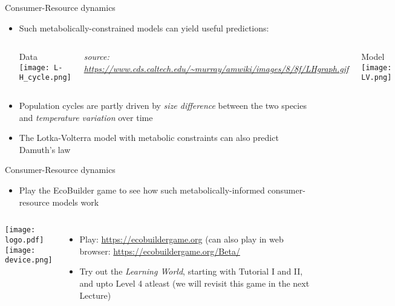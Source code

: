\begin{frame}{Consumer-Resource dynamics}

  \begin{itemize}[<+->] \itemsep3pt
    \item Such metabolically-constrained models can yield useful predictions:
    \vspace{4pt}
    \begin{columns}[c]
      \centering
        Data\\
        \texttt{[image: L-H\_cycle.png]}\\
        {\it \tiny source: \url{https://www.cds.caltech.edu/~murray/amwiki/images/8/8f/LHgraph.gif}\par}
      \centering
        Model\\
        \vspace{10pt}
        \texttt{[image: LV.png]}
    \end{columns} 
  
    \item Population cycles are partly driven by {\it size difference} between the two species and {\it temperature variation} over time

  \item The Lotka-Volterra model with metabolic constraints can also predict Damuth's law\footnotemark
  
\end{itemize}
\end{frame}

\begin{frame}{Consumer-Resource dynamics}

  \begin{itemize}[<+->] \itemsep6pt
     \item Play the EcoBuilder game to see how such metabolically-informed consumer-resource models work 
  \end{itemize}

  \begin{columns}[c]
    \centering
      \texttt{[image: logo.pdf]}\\
      \texttt{[image: device.png]}
    \centering
      \begin{itemize}[<+->] \itemsep8pt
        \item Play: \small \url{https://ecobuildergame.org} (can also play in web browser: \url{https://ecobuildergame.org/Beta/}
        \item Try out the {\it Learning World}, starting with Tutorial I and II, and upto Level 4 atleast (we will revisit this game in the next Lecture)
    \end{itemize}
  \end{columns} 


\end{frame}
  

